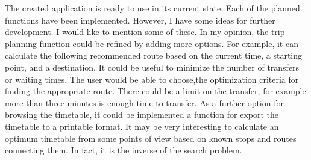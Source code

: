 The created application is ready to use in its current state. Each of the planned functions have been implemented. However, I have some ideas for further development. I would like to mention some of these. In my opinion, the trip planning function could be refined by adding more options. For example, it can calculate the following recommended route based on the current time, a starting point, and a destination. It could be useful to minimize the number of transfers or waiting times. The user would be able to choose,the optimization criteria for finding the appropriate route. There could be a limit on the transfer, for example more than three minutes is enough time to transfer. As a further option for browsing the timetable, it could be implemented a function for export the timetable to a printable format. It may be very interesting to calculate an optimum timetable from some points of view based on known stops and routes connecting them. In fact, it is the inverse of the search problem.
